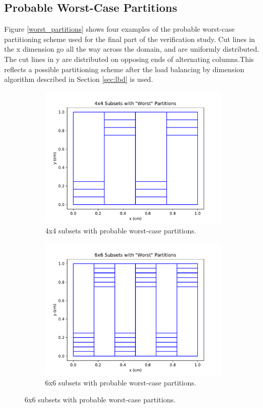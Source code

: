 \subsection{Probable Worst-Case Partitions}
Figure \ref{worst_partitions} shows four examples of the probable worst-case partitioning scheme used for the final part of the verification study. Cut lines in the x dimension go all the way across the domain, and are uniformly distributed. The cut lines in y are distributed on opposing ends of alternating columns.This reflects a possible partitioning scheme after the load balancing by dimension algorithm described in Section \ref{sec:lbd} is used.
\begin{figure}[H]
\centering
\begin{subfigure}[b]{0.45\textwidth}
  \includegraphics[width=\textwidth]{../cut_line_files/4_worst.pdf}
  \caption{4x4 subsets with probable worst-case partitions.}
  \label{4worst}
\end{subfigure}
\begin{subfigure}[b]{0.45\textwidth}
  \includegraphics[width=\textwidth]{../cut_line_files/6_worst.pdf}
  \caption{6x6 subsets with probable worst-case partitions.}
  \label{6worst}
\end{subfigure}


\end{figure}
